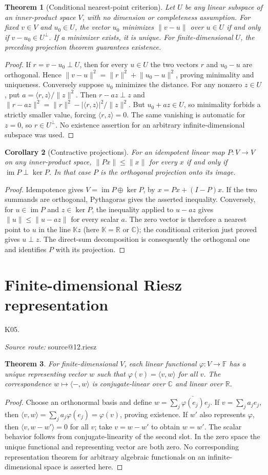 \documentclass[11pt,a4paper]{book}
\makeatletter
\newtheorem{theorem}{Theorem}[chapter]
\newtheorem{corollary}[theorem]{Corollary}
\theoremstyle{definition}\newtheorem{definition}[theorem]{Definition}
\theoremstyle{remark}\newtheorem{remark}[theorem]{Remark}
\newcommand{\K}{\mathbb K}\newcommand{\R}{\mathbb R}\newcommand{\C}{\mathbb C}
\DeclareMathOperator{\im}{im}\DeclareMathOperator{\rank}{rank}
\newcommand{\ip}[2]{\langle #1,#2\rangle}
\newcommand{\norm}[1]{\lVert #1\rVert}
\newcommand{\Kentry}[2]{\section{#2}\label{k:#1}\noindent\textsf{\small K05.\detokenize{#1}}\par
  \begingroup\small\color{black!65}\textit{Source route: }\csname source@#1\endcsname\par\endgroup}
\makeatother
\begin{document}
\begin{theorem}[Conditional nearest-point criterion]
Let $U$ be any linear subspace of an inner-product space $V$, with no dimension or completeness assumption. For fixed $v\in V$ and $u_0\in U$, the vector $u_0$ minimizes $\norm{v-u}$ over $u\in U$ if and only if $v-u_0\in U^\perp$. If a minimizer exists, it is unique. For finite-dimensional $U$, the preceding projection theorem guarantees existence.
\end{theorem}
\begin{proof}
If $r=v-u_0\perp U$, then for every $u\in U$ the two vectors $r$ and $u_0-u$ are orthogonal. Hence
$\norm{v-u}^2=\norm r^2+\norm{u_0-u}^2$, proving minimality and uniqueness. Conversely suppose $u_0$ minimizes the distance. For any nonzero $z\in U$, put $a=\ip rz/\norm z^2$. Then $r-az\perp z$ and
$\norm{r-az}^2=\norm r^2-|\ip rz|^2/\norm z^2$.
But $u_0+az\in U$, so minimality forbids a strictly smaller value, forcing $\ip rz=0$. The same vanishing is automatic for $z=0$, so $r\in U^\perp$. No existence assertion for an arbitrary infinite-dimensional subspace was used.
\end{proof}

\begin{corollary}[Contractive projections]
For an idempotent linear map $P:V\to V$ on any inner-product space, $\norm{Px}\le\norm x$ for every $x$ if and only if $\im P\perp\ker P$. In that case $P$ is the orthogonal projection onto its image.
\end{corollary}
\begin{proof}
Idempotence gives $V=\im P\oplus\ker P$, by $x=Px+(I-P)x$. If the two summands are orthogonal, Pythagoras gives the asserted inequality. Conversely, for $u\in\im P$ and $z\in\ker P$, the inequality applied to $u-az$ gives $\norm u\le\norm{u-az}$ for every scalar $a$. The zero vector is therefore a nearest point to $u$ in the line $\K z$ (here $\K=\R$ or $\C$); the conditional criterion just proved gives $u\perp z$. The direct-sum decomposition is consequently the orthogonal one and identifies $P$ with its projection.
\end{proof}

\Kentry{12.riesz}{Finite-dimensional Riesz representation}
\begin{theorem}
For finite-dimensional $V$, each linear functional $\varphi:V\to\mathbb F$ has a unique representing vector $w$ such that $\varphi(v)=\ip vw$ for all $v$. The correspondence $w\mapsto\ip{-}{w}$ is conjugate-linear over $\C$ and linear over $\R$.
\end{theorem}
\begin{proof}
Choose an orthonormal basis and define $w=\sum_j\overline{\varphi(e_j)}e_j$. If $v=\sum_j a_j e_j$, then
$\ip vw=\sum_j a_j\varphi(e_j)=\varphi(v)$, proving existence. If $w'$ also represents $\varphi$, then $\ip v{w-w'}=0$ for all $v$; take $v=w-w'$ to obtain $w=w'$. The scalar behavior follows from conjugate-linearity of the second slot. In the zero space the unique functional and representing vector are both zero. No corresponding representation theorem for arbitrary algebraic functionals on an infinite-dimensional space is asserted here.
\end{proof}
\end{document}
